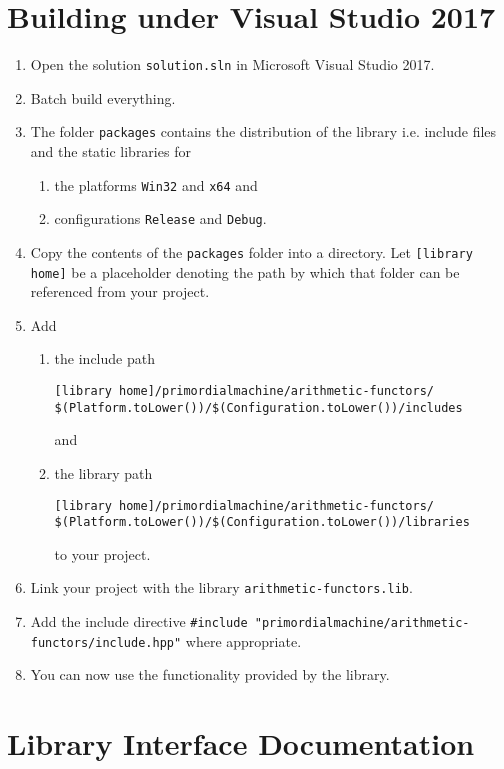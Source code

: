 \documentclass[oneside]{article}
\begin{document}
\section{Building under Visual Studio 2017}
\begin{enumerate}
\item Open the solution \texttt{solution.sln} in Microsoft Visual Studio 2017.
\item Batch build everything.
\item The folder \texttt{packages} contains the distribution of the library i.e. include files and the
      static libraries for
  \begin{enumerate}
    \item the platforms \texttt{Win32} and \texttt{x64} and
    \item configurations \texttt{Release} and \texttt{Debug}.
  \end{enumerate}
\item Copy the contents of the \verb+packages+ folder into a directory. Let
      \verb+[library home]+ be a placeholder denoting the path by which that folder
      can be referenced from your project.
\item Add
  \begin{enumerate}
    \item the include path
\begin{verbatim}
[library home]/primordialmachine/arithmetic-functors/
$(Platform.toLower())/$(Configuration.toLower())/includes
\end{verbatim}
	and
    \item the library path
\begin{verbatim}
[library home]/primordialmachine/arithmetic-functors/
$(Platform.toLower())/$(Configuration.toLower())/libraries
\end{verbatim}
    to your project.
\end{enumerate}
\item Link your project with the library \verb+arithmetic-functors.lib+.
\item Add the include directive \verb+#include "primordialmachine/arithmetic-functors/include.hpp"+ where appropriate.
\item You can now use the functionality provided by the library.
\end{enumerate}

\section{Library Interface Documentation}
\end{document}
